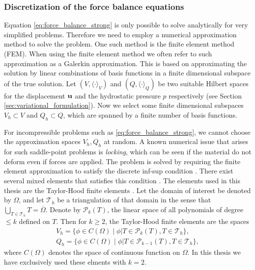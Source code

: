 \subsubsection{Discretization of the force balance equations}

Equation \eqref{eq:force_balance_strong} is only possible to solve
analytically for very simplified problems. Therefore we need to employ
a numerical approximation method to solve the problem. One such method
is the finite element method (FEM). When using the finite element method we often refer to such
approximation as a Galerkin approximation. This is based on
approximating the solution by linear combinations of  basis functions in a finite dimensional
subspace of the true solution. Let $(V, \langle \cdot \rangle_V)$
and $(Q, \langle \cdot \rangle_Q)$ be two suitable Hilbert
spaces for the displacement $\mathbf{u}$ and the hydrostatic pressure $p$
respectively (see Section \ref{sec:variational_formulation}). Now we
select some finite dimensional subspaces $V_h \subset V$ and $Q_h
\subset Q$, which are spanned by a finite number of basis functions.


For incompressible problems such as \eqref{eq:force_balance_strong}, we cannot choose the
approximation spaces $V_h, Q_h$ at random. A known numerical issue
that arises for such saddle-point problems is \emph{locking}, which can be
seen if the material do not deform even if forces are applied. The
problem is solved by requiring the finite element approximation to
satisfy the discrete inf-sup condition \cite{le1982existence}. There
exist several mixed elements that satisfies this condition
\cite{chapelle1993inf}. The elements used in this thesis are the
Taylor-Hood finite elements \cite{taylor1973numerical}. Let the domain of
interest be denoted by $\Omega$, and let $\mathcal{T}_h$ be a
triangulation of that domain in the sense that $\bigcup_{T \in
  \mathcal{T}_h} T = \overline{\Omega}$. Denote by $\mathcal{P}_k
(T)$, the linear space of all polynomials of degree $\leq k$ defined
on $T$. Then for $k \geq 2$, the Taylor-Hood finite elements are the spaces
\begin{align}
  V_h = \{  \phi \in C(\Omega) \;  | \; \phi \big| T  \in \mathcal{P}_k (T) , T \in \mathcal{T}_h \},\\
  Q_h = \{  \phi \in C(\Omega) \;  | \; \phi \big| T  \in \mathcal{P}_{k-1} (T) , T \in \mathcal{T}_h \},
\end{align}
where $C(\Omega)$ denotes the space of continuous function on
$\Omega$. In this thesis we have exclusively used these elments with
$k = 2$.



